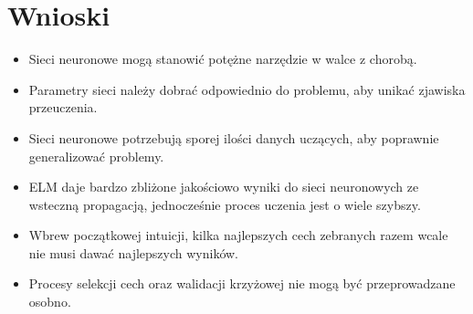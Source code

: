 \chapter{Wnioski}
\begin{itemize}
	\item{Sieci neuronowe mogą stanowić potężne narzędzie w walce z chorobą.}
	\item{Parametry sieci należy dobrać odpowiednio do problemu, aby unikać zjawiska przeuczenia.}
	\item{Sieci neuronowe potrzebują sporej ilości danych uczących, aby poprawnie generalizować problemy.}
	\item{ELM daje bardzo zbliżone jakościowo wyniki do sieci neuronowych ze wsteczną propagacją, jednocześnie proces uczenia jest o wiele szybszy.}
	\item{Wbrew początkowej intuicji, kilka najlepszych cech zebranych razem wcale nie musi dawać najlepszych wyników.}
	\item{Procesy selekcji cech oraz walidacji krzyżowej nie mogą być przeprowadzane osobno.}
\end{itemize}